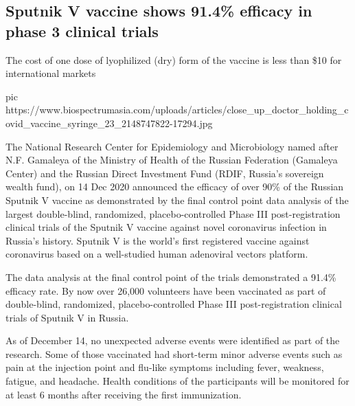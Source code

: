  
 
 
 
 
 
\subsection{Sputnik V vaccine shows 91.4\% efficacy in phase 3 clinical trials}
\label{sec:15_12_2020.sites.biospectrumasia.1.sputnik_v_efficacy}

The cost of one dose of lyophilized (dry) form of the vaccine is less than \$10
for international markets

\ifcmt
  pic https://www.biospectrumasia.com/uploads/articles/close_up_doctor_holding_covid_vaccine_syringe_23_2148747822-17294.jpg
\fi

The National Research Center for Epidemiology and Microbiology named after N.F.
Gamaleya of the Ministry of Health of the Russian Federation (Gamaleya Center)
and the Russian Direct Investment Fund (RDIF, Russia’s sovereign wealth fund),
on 14 Dec 2020 announced the efficacy of over 90\% of the Russian Sputnik V
vaccine as demonstrated by the final control point data analysis of the largest
double-blind, randomized, placebo-controlled Phase III post-registration
clinical trials of the Sputnik V vaccine against novel coronavirus infection in
Russia’s history. Sputnik V is the world’s first registered vaccine against
coronavirus based on a well-studied human adenoviral vectors platform.

The data analysis at the final control point of the trials demonstrated a
91.4\% efficacy rate. By now over 26,000 volunteers have been vaccinated as
part of double-blind, randomized, placebo-controlled Phase III
post-registration clinical trials of Sputnik V in Russia.

As of December 14, no unexpected adverse events were identified as part of the
research. Some of those vaccinated had short-term minor adverse events such as
pain at the injection point and flu-like symptoms including fever, weakness,
fatigue, and headache. Health conditions of the participants will be monitored
for at least 6 months after receiving the first immunization.

